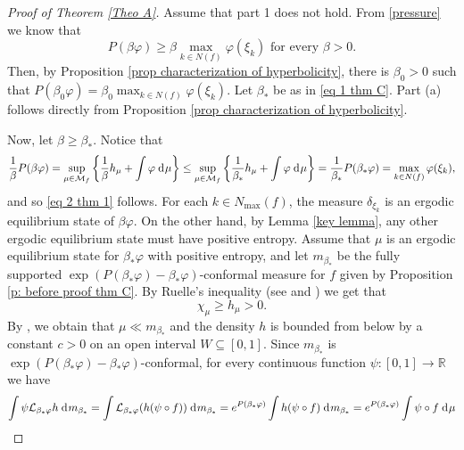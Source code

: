 \documentclass[12pt]{amsart}
\numberwithin{equation}{section} %
\numberwithin{figure}{section} %
\theoremstyle{plain}
\theoremstyle{definition}
\theoremstyle{remark}
\theoremstyle{citing}
\newcommand{\R}{\mathbb{R}}
\renewcommand{\=}{\coloneqq}
\newcommand{\dd}{\hspace{1pt}\operatorname{d}\hspace{-1pt}}
\begin{document}
\begin{proof}[Proof of Theorem \ref{Theo A}]
    Assume that part 1 does not hold. From \eqref{pressure} we know that
    \begin{equation}
    P(\beta\varphi) \geq \beta\max_{k\in N(f)}\varphi(\xi_k) \text{ for every } \beta>0.
    \end{equation}
     Then, by Proposition \ref{prop characterization of hyperbolicity}, there is $\beta_0>0$ such that $P(\beta_0 \varphi)= \beta_0 \max_{k\in N(f)}\varphi(\xi_k)$. Let $\beta_*$ be as in \eqref{eq 1 thm C}. Part (a) follows directly from Proposition \ref{prop characterization of hyperbolicity}. 

     Now, let $\beta\geq \beta_*$. Notice that
    \begin{equation*}
        \frac{1}{\beta}P(\beta\varphi) = \sup_{\mu\in \mathcal{M}_f} \left\{\frac{1}{\beta}h_\mu + \int \varphi \dd\mu\right\}\leq \sup_{\mu \in \mathcal{M}_f}\left\{\frac{1}{\beta_*}h_\mu + \int \varphi \dd\mu\right\} = \frac{1}{\beta_*}P(\beta_* \varphi) = \max_{k\in N(f)}\varphi(\xi_k),
    \end{equation*}
    and so \eqref{eq 2 thm 1} follows. For each $k\in N_{\max}(f)$, the measure $\delta_{\xi_k}$ is an ergodic equilibrium state of $\beta\varphi$. On the other hand, by Lemma \ref{key lemma}, any other ergodic equilibrium state must have positive entropy. Assume that $\mu$ is an ergodic equilibrium state for $\beta_*\varphi$ with positive entropy, and let $m_{\beta_*}$ be the fully supported $\exp(P(\beta_*\varphi)- \beta_*\varphi)$-conformal measure for $f$ given by Proposition \ref{p: before proof thm C}. By Ruelle's inequality (see \cite[Theorem 2]{Hofbauer91} and \cite[Theorem 7.1]{BarrioJimenez}) we get that
    \begin{equation*}
        \chi_\mu \geq h_\mu>0.
    \end{equation*}
    By \cite[Theorem 6]{Dobbs}, we obtain that $\mu\ll m_{\beta_*}$ and the density $h$ is bounded from below by a constant $c>0$ on an open interval $W\subseteq [0,1]$. Since $m_{\beta_*}$ is $\exp(P(\beta_*\varphi)-\beta_*\varphi)$-conformal, for every continuous function $\psi:[0,1]\to \R$ we have
    \begin{equation*}
    \begin{split}
        \int \psi\mathcal{L}_{\beta_*\varphi} h \dd m_{\beta_*} &= \int \mathcal{L}_{\beta_*\varphi}(h(\psi\circ f)) \dd m_{\beta_*}= e^{P(\beta_*\varphi)}\int h(\psi\circ f)\dd m_{\beta_*} = e^{P(\beta_*\varphi)}\int \psi \circ f \dd \mu\\

\end{split}
\end{equation*}
\end{proof}
\end{document}
